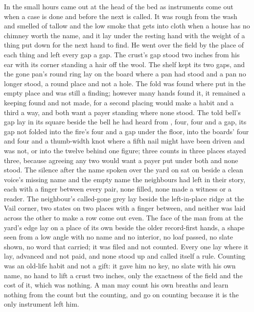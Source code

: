 In the small hours  came out at the head of the bed as instruments come out when a case is done and before the next is called. It was rough from the wash and smelled of tallow and the low smoke that gets into cloth when a house has no chimney worth the name, and it lay under the resting hand with the weight of a thing put down for the next hand to find. He went over the field by the place of each thing and left every gap a gap. The crust's gap stood two inches from his ear with its corner standing a hair off the wool. The shelf kept its two gaps, and the gone pan's round ring lay on the board where a pan had stood and a pan no longer stood, a round place and not a hole. The fold was found where put in the empty place and was still a finding; however many hands found it, it remained a keeping found and not made, for a second placing would make a habit and a third a way, and both want a payer standing where none stood. The told bell's gap lay in its square beside the bell he had heard from , four, four and a gap, its gap not folded into the fire's four and a gap under the floor, into the boards' four and four and a thumb-width knot where a fifth nail might have been driven and was not, or into the twelve behind one figure; three counts in three places stayed three, because agreeing any two would want a payer put under both and none stood. The silence after the name spoken over the yard on  sat on  beside a clean voice's missing name and the empty name the neighbours had left in their story, each with a finger between every pair, none filled, none made a witness or a reader. The neighbour's called-gone grey lay beside the left-in-place ridge at the Vail corner, two states on two places with a finger between, and neither was laid across the other to make a row come out even. The face of the man from  at the yard's edge lay on a place of its own beside the older record-first hands, a shape seen from a low angle with no name and no interior, no loaf passed, no slate shown, no word that carried; it was filed and not counted. Every one lay where it lay, advanced and not paid, and none stood up and called itself a rule. Counting was an old-life habit and not a gift: it gave him no key, no slate with his own name, no hand to lift a crust two inches, only the exactness of the field and the cost of it, which was nothing. A man may count his own breaths and learn nothing from the count but the counting, and go on counting because it is the only instrument left him.

